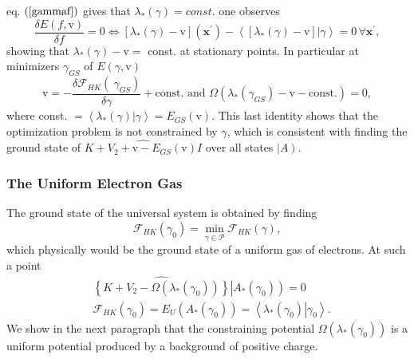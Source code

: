 \documentclass[aps,preprint]{revtex4}%
\begin{document}
eq. $\left(  \ref{gammaf}\right)  $ gives that $\lambda_{\ast}\left(
\gamma\right)  =const.$ one observes
\begin{equation}
\frac{\delta E\left(  f\mathbf{,}\mathrm{v}\right)  }{\delta f}%
=0\Leftrightarrow\left[  \lambda_{\ast}\left(  \gamma\right)  -\mathrm{v}%
\right]  \left(  \mathbf{x}^{\prime}\right)  -\left\langle \left.  \left[
\lambda_{\ast}\left(  \gamma\right)  -\mathrm{v}\right]  \right\vert
\gamma\right\rangle =0\,\forall\mathbf{x}^{\prime},
\end{equation}
showing that $\lambda_{\ast}\left(  \gamma\right)  -\mathrm{v}=$ const. at
stationary points. In particular at minimizers $\gamma_{GS}$ of $E\left(
\gamma\mathbf{,}\mathrm{v}\right)  $
\begin{equation}
\mathrm{v}=-\frac{\delta\mathcal{F}_{HK}\left(  \ \gamma_{GS}\right)  }%
{\delta\gamma}+\text{const. and }\Omega\left(  \lambda_{\ast}\left(
\gamma_{GS}\right)  -\mathrm{v}-\text{const.}\right)  =0,
\end{equation}
where const. $=\left\langle \left.  \lambda_{\ast}\left(  \gamma\right)
\right\vert \gamma\right\rangle =E_{GS}\left(  \mathrm{v}\right)  .$ This last
identity shows that the optimization problem is not constrained by $\gamma$,
which is consistent with finding the ground state of $\widehat{K+V_{2}%
+\mathrm{v}-E_{GS}\left(  \mathrm{v}\right)  I}$ over all states $\left\vert
A\right)  .$

\subsubsection{The Uniform Electron Gas\label{ElecGas}}

The ground state of the universal system is obtained by finding
\begin{equation}
\mathcal{F}_{HK}\left(  \gamma_{0}\right)  =\min_{\gamma\in\mathcal{P}%
}\mathcal{F}_{HK}\left(  \gamma\right)  , \label{EUniGS}%
\end{equation}
which physically would be the ground state of a uniform gas of electrons. At
such a point%
\begin{align}
&  \widehat{\left\{  K+V_{2}-\Omega\left(  \lambda_{\ast}\left(  \gamma
_{0}\right)  \right)  \right\}  }\left\vert A_{\ast}\left(  \gamma_{0}\right)
\right)  =0\nonumber\\
&  \mathcal{F}_{HK}\left(  \gamma_{0}\right)  =E_{U}\left(  A_{\ast}\left(
\gamma_{0}\right)  \right)  =\left\langle \left.  \lambda_{\ast}\left(
\gamma_{0}\right)  \right\vert \gamma_{0}\right\rangle .
\end{align}
We show in the next paragraph that the constraining potential $\Omega\left(
\lambda_{\ast}\left(  \gamma_{0}\right)  \right)  $ is a uniform potential
produced by a background of positive charge.
\end{document}
